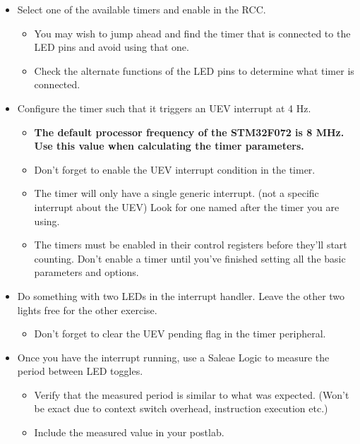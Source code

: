\documentclass[11pt,fleqn]{book} %
\begin{document}
\begin{itemize}
    \item Select one of the available timers and enable in the RCC.
    \begin{itemize}
        \item You may wish to jump ahead and find the timer that is connected to the LED pins and avoid using that one. 
        \item Check the alternate functions of the LED pins to determine what timer is connected.
    \end{itemize}
    \item Configure the timer such that it triggers an UEV interrupt at 4 Hz.
    \begin{itemize}
        \item \textbf{The default processor frequency of the STM32F072 is 8 MHz. Use this value when calculating the timer parameters.}
        \item Don't forget to enable the UEV interrupt condition in the timer. 
        \item The timer will only have a single generic interrupt. (not a specific interrupt about the UEV) Look for one named after the timer you are using. 
        \item The timers must be enabled in their control registers before they'll start counting. Don't enable a timer until you've finished setting all the basic parameters and options. 
    \end{itemize}
    \item Do something with two LEDs in the interrupt handler. Leave the other two lights free for the other exercise. 
     \begin{itemize}
         \item Don't forget to clear the UEV pending flag in the timer peripheral. 
     \end{itemize}
     \item Once you have the interrupt running, use a Saleae Logic to measure the period between LED toggles.
     \begin{itemize}
         \item Verify that the measured period is similar to what was expected. (Won't be exact due to context switch overhead, instruction execution etc.)
         \item Include the measured value in your postlab.
     \end{itemize}
\end{itemize}
\end{document}
